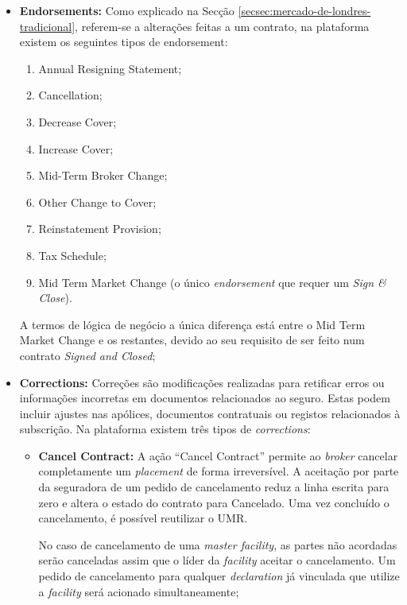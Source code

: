 \begin{itemize}
            \item \textbf{Endorsements:} Como explicado na Secção \ref{secsec:mercado-de-londres-tradicional}, referem-se a alterações feitas a um contrato, na plataforma existem os seguintes tipos de endorsement:
            \begin{enumerate}
                \item Annual Resigning Statement;
                \item Cancellation;
                \item Decrease Cover;
                \item Increase Cover;
                \item Mid-Term Broker Change;
                \item Other Change to Cover;
                \item Reinstatement Provision;
                \item Tax Schedule;
                \item Mid Term Market Change (o único \textit{endorsement} que requer um \textit{Sign \& Close}).
            \end{enumerate}
            A termos de lógica de negócio a única diferença está entre o Mid Term Market Change e os restantes, devido ao seu requisito de ser feito num contrato \textit{Signed and Closed};

            \item \textbf{Corrections:} Correções são modificações realizadas para retificar erros ou informações incorretas em documentos relacionados ao seguro. Estas podem incluir ajustes nas apólices, documentos contratuais ou registos relacionados à subscrição. Na plataforma existem três tipos de \textit{corrections}:
            \begin{itemize}

                 \item \textbf{Cancel Contract:}
                 A ação ``Cancel Contract'' permite ao \textit{broker} cancelar completamente um \textit{placement} de forma irreversível. A aceitação por parte da seguradora de um pedido de cancelamento reduz a linha escrita para zero e altera o estado do contrato para Cancelado. Uma vez concluído o cancelamento, é possível reutilizar o UMR. 
                 
                 No caso de cancelamento de uma \textit{master facility}, as partes não acordadas serão canceladas assim que o líder da \textit{facility} aceitar o cancelamento. Um pedido de cancelamento para qualquer \textit{declaration} já vinculada que utilize a \textit{facility} será acionado simultaneamente;
                 

\end{itemize}
\end{itemize}
